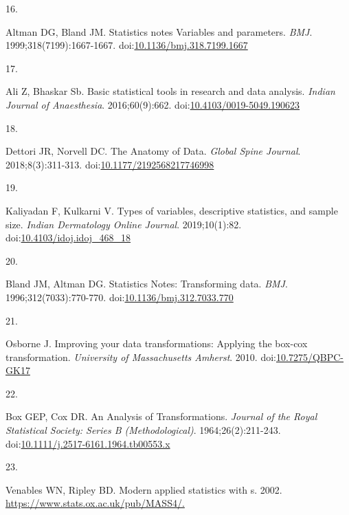 \documentclass[
]{book}
\newlength{\cslhangindent}
\newlength{\csllabelwidth}
\newlength{\cslentryspacingunit} %
\newenvironment{CSLReferences}[2] %
 {%
  \setlength{\parindent}{0pt}
  \ifodd #1
  \let\oldpar\par
  \def\par{\hangindent=\cslhangindent\oldpar}
  \fi
  \setlength{\parskip}{#2\cslentryspacingunit}
 }%
 {}
\newcommand{\CSLLeftMargin}[1]{\parbox[t]{\csllabelwidth}{#1}}
\newcommand{\CSLRightInline}[1]{\parbox[t]{\linewidth - \csllabelwidth}{#1}\break}
\begin{document}
\begin{CSLReferences}{0}{0}
\leavevmode{}%
\CSLLeftMargin{16. }%
\CSLRightInline{Altman DG, Bland JM. Statistics notes Variables and parameters. \emph{BMJ}. 1999;318(7199):1667-1667. doi:\href{https://doi.org/10.1136/bmj.318.7199.1667}{10.1136/bmj.318.7199.1667}}

\leavevmode{}%
\CSLLeftMargin{17. }%
\CSLRightInline{Ali Z, Bhaskar Sb. Basic statistical tools in research and data analysis. \emph{Indian Journal of Anaesthesia}. 2016;60(9):662. doi:\href{https://doi.org/10.4103/0019-5049.190623}{10.4103/0019-5049.190623}}

\leavevmode{}%
\CSLLeftMargin{18. }%
\CSLRightInline{Dettori JR, Norvell DC. The Anatomy of Data. \emph{Global Spine Journal}. 2018;8(3):311-313. doi:\href{https://doi.org/10.1177/2192568217746998}{10.1177/2192568217746998}}

\leavevmode{}%
\CSLLeftMargin{19. }%
\CSLRightInline{Kaliyadan F, Kulkarni V. Types of variables, descriptive statistics, and sample size. \emph{Indian Dermatology Online Journal}. 2019;10(1):82. doi:\href{https://doi.org/10.4103/idoj.idoj_468_18}{10.4103/idoj.idoj\_468\_18}}

\leavevmode{}%
\CSLLeftMargin{20. }%
\CSLRightInline{Bland JM, Altman DG. Statistics Notes: Transforming data. \emph{BMJ}. 1996;312(7033):770-770. doi:\href{https://doi.org/10.1136/bmj.312.7033.770}{10.1136/bmj.312.7033.770}}

\leavevmode{}%
\CSLLeftMargin{21. }%
\CSLRightInline{Osborne J. Improving your data transformations: Applying the box-cox transformation. \emph{University of Massachusetts Amherst}. 2010. doi:\href{https://doi.org/10.7275/QBPC-GK17}{10.7275/QBPC-GK17}}

\leavevmode{}%
\CSLLeftMargin{22. }%
\CSLRightInline{Box GEP, Cox DR. An Analysis of Transformations. \emph{Journal of the Royal Statistical Society: Series B (Methodological)}. 1964;26(2):211-243. doi:\href{https://doi.org/10.1111/j.2517-6161.1964.tb00553.x}{10.1111/j.2517-6161.1964.tb00553.x}}

\leavevmode{}%
\CSLLeftMargin{23. }%
\CSLRightInline{Venables WN, Ripley BD. Modern applied statistics with s. 2002. \href{https://www.stats.ox.ac.uk/pub/MASS4/}{https://www.stats.ox.ac.uk/pub/MASS4/.}}


\end{CSLReferences}
\end{document}
